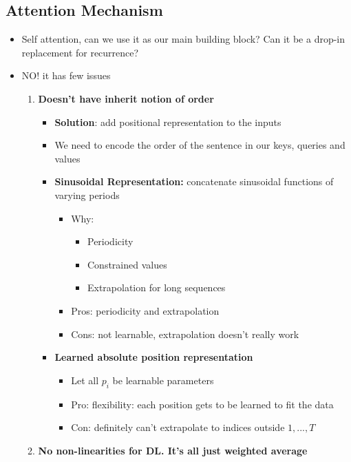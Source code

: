 \subsection{Attention Mechanism}
\begin{itemize}
    \item Self attention, can we use it as our main building block? Can it be a drop-in replacement for recurrence?
    \item NO! it has few issues
    \begin{enumerate}
        \item \textbf{Doesn't have inherit notion of order}
        \begin{itemize}
            \item \textbf{Solution}: add positional representation to the inputs
            \item We need to encode the order of the sentence in our keys, queries and values
            \item \textbf{Sinusoidal Representation:} concatenate sinusoidal functions of varying periods
            \begin{itemize}
                \item Why:
                \begin{itemize}
                    \item Periodicity
                    \item Constrained values
                    \item Extrapolation for long sequences
                \end{itemize}
                \item Pros: periodicity and extrapolation
                \item Cons: not learnable, extrapolation doesn't really work
            \end{itemize}
            \item \textbf{Learned absolute position representation}
            \begin{itemize}
                \item Let all \(p_i\) be learnable parameters
                \item Pro: flexibility: each position gets to be learned to fit the data
                \item Con: definitely can't extrapolate to indices outside \(1,...,T\)
            \end{itemize}
        \end{itemize}
        \item \textbf{No non-linearities for DL. It's all just weighted average}

\end{enumerate}
\end{itemize}
